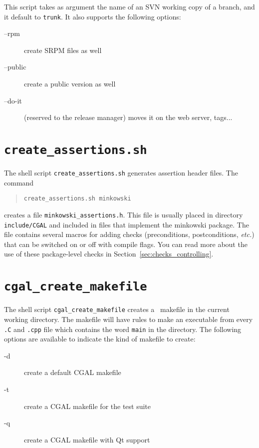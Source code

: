This script takes as argument the name of an SVN working copy of a branch,
and it default to {\tt trunk}.  It also supports the following options:
\begin{description}
\item[--rpm]      create SRPM files as well
\item[--public]   create a public version as well
\item[--do-it]    (reserved to the release manager) moves it on the web server,
                  tags...
\end{description}


\section{{\tt create\_assertions.sh}}
\label{sec:create_assertions}

The shell script
{{\tt create\_assertions.sh}} generates assertion header files.
The command
\begin{verse}
{\tt create\_assertions.sh minkowski}
\end{verse}
creates a file {\tt minkowski\_assertions.h}.
This file is usually placed in directory {\tt include/CGAL} and included in
files that implement the minkowski package.
The file contains several macros for adding checks (preconditions,
postconditions, {\em etc.}) that can be switched on or off with compile
flags.
You can read more about the use of these package-level checks in
Section~\ref{sec:checks_controlling}.


\section{{\tt cgal\_create\_makefile}}
\label{sec:cgal_create_makefile}

The shell script
{{\tt cgal\_create\_makefile}} creates a \cgal\ makefile
in the current working directory.
The makefile will have rules to make an executable from every {\tt .C}
and {\tt .cpp} file which contains the word {\tt main} in the directory.
The following options are available to indicate the kind of makefile
to create:
\begin{description}
\item[-d]   create a default CGAL makefile
\item[-t]   create a CGAL makefile for the test suite
\item[-q]   create a CGAL makefile with Qt support
\end{description}

